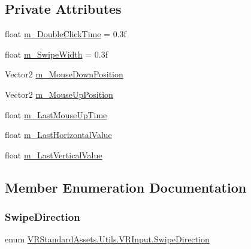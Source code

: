 \subsection*{Private Attributes}
\begin{DoxyCompactItemize}
\item 
float \mbox{\hyperlink{class_v_r_standard_assets_1_1_utils_1_1_v_r_input_ac9872d104ac983e43ab3a77057807676}{m\+\_\+\+Double\+Click\+Time}} = 0.\+3f
\item 
float \mbox{\hyperlink{class_v_r_standard_assets_1_1_utils_1_1_v_r_input_a07546688dd3d1f83aa1862853c0f6501}{m\+\_\+\+Swipe\+Width}} = 0.\+3f
\item 
Vector2 \mbox{\hyperlink{class_v_r_standard_assets_1_1_utils_1_1_v_r_input_a7a03517dfaeed90e07863ec2562704aa}{m\+\_\+\+Mouse\+Down\+Position}}
\item 
Vector2 \mbox{\hyperlink{class_v_r_standard_assets_1_1_utils_1_1_v_r_input_aec977a8bd3fb2b1821dac01ddb0a33ef}{m\+\_\+\+Mouse\+Up\+Position}}
\item 
float \mbox{\hyperlink{class_v_r_standard_assets_1_1_utils_1_1_v_r_input_a839d56368fff7606c43d65ccba8a769e}{m\+\_\+\+Last\+Mouse\+Up\+Time}}
\item 
float \mbox{\hyperlink{class_v_r_standard_assets_1_1_utils_1_1_v_r_input_ad0b9f0689c1e4813c70dd6326783dcd7}{m\+\_\+\+Last\+Horizontal\+Value}}
\item 
float \mbox{\hyperlink{class_v_r_standard_assets_1_1_utils_1_1_v_r_input_aa92baa6f51fd201eb34d98298c8bb4bc}{m\+\_\+\+Last\+Vertical\+Value}}
\end{DoxyCompactItemize}


\subsection{Member Enumeration Documentation}
\mbox{\label{class_v_r_standard_assets_1_1_utils_1_1_v_r_input_a2ea76769ddd926c08921d6684d332538}} 
\subsubsection{\texorpdfstring{Swipe\+Direction}{SwipeDirection}}
{\footnotesize\ttfamily enum \mbox{\hyperlink{class_v_r_standard_assets_1_1_utils_1_1_v_r_input_a2ea76769ddd926c08921d6684d332538}{V\+R\+Standard\+Assets.\+Utils.\+V\+R\+Input.\+Swipe\+Direction}}\hspace{0.3cm}{\ttfamily [strong]}}

